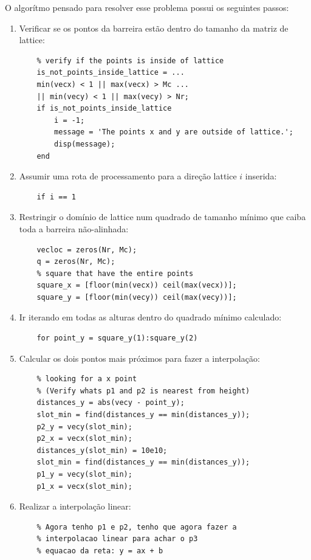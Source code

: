 O algorítmo pensado para resolver esse problema possui os seguintes passos:
\begin{enumerate}
    \item Verificar se os pontos da barreira estão dentro do tamanho da matriz de lattice:
    \begin{lstlisting}
    % verify if the points is inside of lattice
    is_not_points_inside_lattice = ... 
    min(vecx) < 1 || max(vecx) > Mc ...
    || min(vecy) < 1 || max(vecy) > Nr;
    if is_not_points_inside_lattice
        i = -1;
        message = 'The points x and y are outside of lattice.';
        disp(message);
    end
    \end{lstlisting}
    \item Assumir uma rota de processamento para a direção lattice $i$ inserida:
    \begin{lstlisting}
    if i == 1
    \end{lstlisting}
    \item Restringir o domínio de lattice num quadrado de tamanho mínimo que caiba toda a barreira não-alinhada:
    \begin{lstlisting}
    vecloc = zeros(Nr, Mc);
    q = zeros(Nr, Mc);
    % square that have the entire points
    square_x = [floor(min(vecx)) ceil(max(vecx))];
    square_y = [floor(min(vecy)) ceil(max(vecy))];
    \end{lstlisting}
    \item Ir iterando em todas as alturas dentro do quadrado mínimo calculado:
    \begin{lstlisting}
    for point_y = square_y(1):square_y(2)
    \end{lstlisting}
    \item Calcular os dois pontos mais próximos para fazer a interpolação:
    \begin{lstlisting}
    % looking for a x point 
    % (Verify whats p1 and p2 is nearest from height)
    distances_y = abs(vecy - point_y);
    slot_min = find(distances_y == min(distances_y));
    p2_y = vecy(slot_min);
    p2_x = vecx(slot_min);
    distances_y(slot_min) = 10e10;
    slot_min = find(distances_y == min(distances_y));
    p1_y = vecy(slot_min);
    p1_x = vecx(slot_min);
    \end{lstlisting}
    \item Realizar a interpolação linear:
    \begin{lstlisting}
    % Agora tenho p1 e p2, tenho que agora fazer a
    % interpolacao linear para achar o p3 
    % equacao da reta: y = ax + b

\end{lstlisting}
\end{enumerate}
